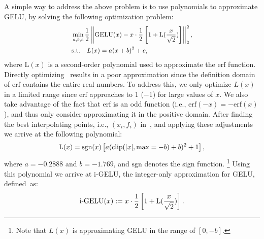 A simple way to address the above problem is to use polynomials to approximate GELU, by solving
the following optimization problem:
\begin{equation}
\small
\begin{split}
\label{eq:gelu_opt_objective}
    &\min_{a,b,c} \frac12\left\| \mathrm{GELU}(x) 
    - x \cdot \frac{1}{2} \left[ 1 + \mathrm{L}(\frac{x}{\sqrt{2}})\right]\right\|_2^2 , \\
    &\mathrm{s.t.} \quad L(x) = a(x+b)^2 + c,
\end{split}
\end{equation}
where $\mathrm{L}(x)$ is a second-order polynomial used to approximate the $\mathrm{erf}$ function. 
Directly optimizing~ results in a poor approximation since the definition domain of $\mathrm{erf}$ contains the entire real numbers. 
To address this, we only optimize $L(x)$ in a limited range since $\mathrm{erf}$ approaches to 1 ($-$1) for large values of $x$.
We also take advantage of the fact that $\mathrm{erf}$ is an odd function (i.e., $\mathrm{erf}(-x)=-\mathrm{erf}(x)$), and thus only consider approximating it in the positive
domain.
After finding the best interpolating points, i.e., $(x_i,f_i)$ in~, and applying these adjustments we arrive at the following polynomial:
\begin{equation}
\label{eq:bestL_erf}
\small
    \mathrm{L}(x) = \mathrm{sgn}(x)\left[a(\mathrm{clip}(|x|, \max=-b)+b)^2 + 1\right],
\end{equation}
where $a=-0.2888$ and $b = -1.769$, and $\mathrm{sgn}$ denotes the sign function.
\footnote{Note that $L(x)$ is approximating GELU in the range of $[0, -b]$.}
Using this polynomial we arrive at i-GELU, the integer-only approximation for GELU, defined~as:
\begin{equation}
\label{eqn:igelu}
\small
\mathrm{i{\text-}GELU}(x) := x \cdot \frac{1}{2} \left[ 1 + \mathrm{L}(\frac{x}{\sqrt{2}})\right].
\end{equation}


\begin{figure}[]
  \vspace{1mm}
\end{figure}


